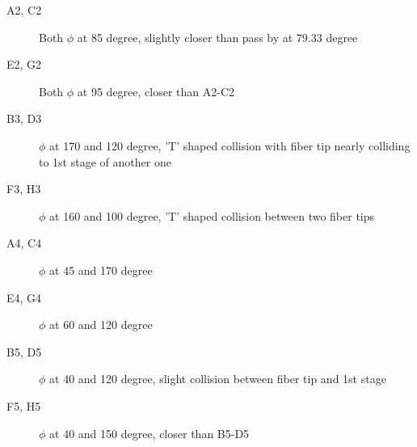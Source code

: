\documentclass[a4paper,notitlepage]{article}
\begin{document}
\begin{description}
  \item[A2, C2] Both $\phi$ at 85 degree, slightly closer than pass by at 79.33 degree
  \item[E2, G2] Both $\phi$ at 95 degree, closer than A2-C2
  \item[B3, D3] $\phi$ at 170 and 120 degree, 'T' shaped collision with fiber tip nearly colliding to 1st stage of another one
  \item[F3, H3] $\phi$ at 160 and 100 degree, 'T' shaped collision between two fiber tips
  \item[A4, C4] $\phi$ at 45 and 170 degree
  \item[E4, G4] $\phi$ at 60 and 120 degree
  \item[B5, D5] $\phi$ at 40 and 120 degree, slight collision between fiber tip and 1st stage
  \item[F5, H5] $\phi$ at 40 and 150 degree, closer than B5-D5
\end{description}
\end{document}
